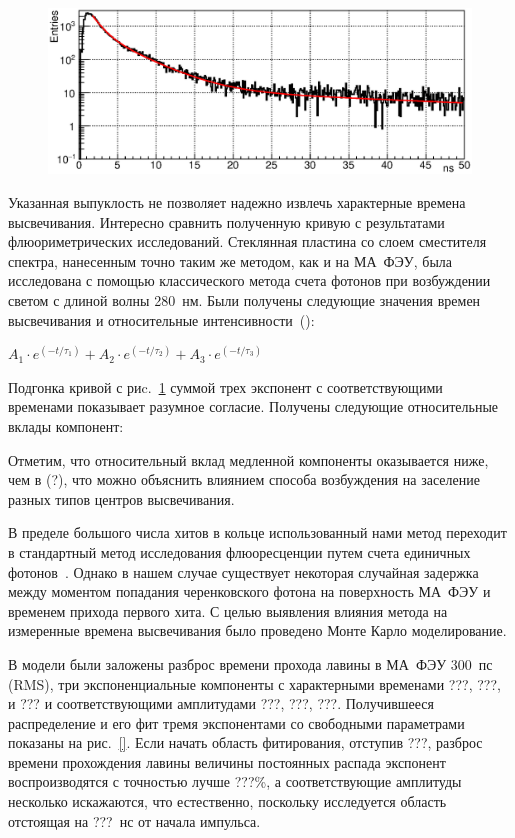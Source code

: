 \begin{figure}
\includegraphics[width=1.0\textwidth]{pictures/WLSdiff_1Nov.eps}
\caption{}
\label{fig:WLSdiff}
\end{figure}

Указанная выпуклость не позволяет надежно извлечь характерные времена высвечивания. Интересно сравнить полученную кривую с результатами флюориметрических исследований. Стеклянная пластина со слоем сместителя спектра, нанесенным точно таким же методом, как и на МА~ФЭУ, была исследована с помощью классического метода счета фотонов при возбуждении светом с длиной волны 280~нм. Были получены следующие значения времен высвечивания и относительные интенсивности~(\cite{DUERR}):

$ A_{1} \cdot e^{(-t / \tau_{1})} + A_{2} \cdot e^{(-t / \tau_{2})} + A_{3} \cdot e^{(-t / \tau_{3})}$

Подгонка кривой с риc.~\ref{fig:WLSdiff} суммой трех экспонент с соответствующими временами показывает разумное согласие. Получены следующие относительные вклады компонент: 


Отметим, что относительный вклад медленной компоненты оказывается ниже, чем в (?), что можно объяснить влиянием способа возбуждения на заселение разных типов центров высвечивания.

В пределе большого числа хитов в кольце использованный нами метод переходит в стандартный метод исследования флюоресценции путем счета единичных фотонов~\cite{}. Однако в нашем случае существует некоторая случайная задержка между моментом попадания черенковского фотона на поверхность МА~ФЭУ и временем прихода первого хита. С целью выявления влияния метода на измеренные времена высвечивания было проведено Монте Карло моделирование.

В модели были заложены разброс времени прохода лавины в МА~ФЭУ 300~пс (RMS), три экспоненциальные компоненты с характерными временами ???, ???, и ??? и соответствующими амплитудами ???, ???, ???. Получившееся распределение и его фит тремя экспонентами со свободными параметрами показаны на рис.~\ref{}. Если начать область фитирования, отступив ???, разброс времени прохождения лавины величины постоянных распада экспонент воспроизводятся с точностью лучше ???\%, а соответствующие амплитуды несколько искажаются, что естественно, поскольку исследуется область отстоящая на ???~нс от начала импульса.

